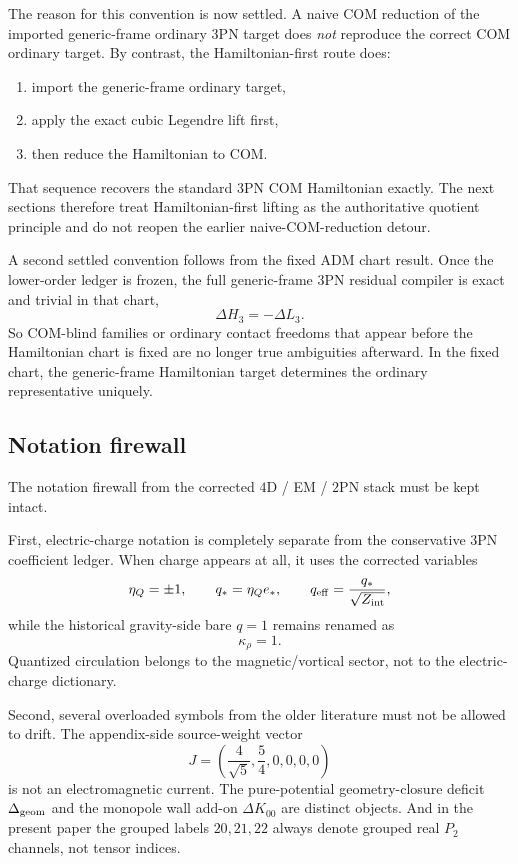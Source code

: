 \documentclass[11pt]{article}
\begin{document}
The reason for this convention is now settled.  A naive COM reduction of the
imported generic-frame ordinary $3$PN target does \emph{not} reproduce the
correct COM ordinary target.  By contrast, the Hamiltonian-first route does:
\begin{enumerate}
  \item import the generic-frame ordinary target,
  \item apply the exact cubic Legendre lift first,
  \item then reduce the Hamiltonian to COM.
\end{enumerate}
That sequence recovers the standard $3$PN COM Hamiltonian exactly.  The next
sections therefore treat Hamiltonian-first lifting as the authoritative quotient
principle and do not reopen the earlier naive-COM-reduction detour.

A second settled convention follows from the fixed ADM chart result.  Once the
lower-order ledger is frozen, the full generic-frame $3$PN residual compiler is
exact and trivial in that chart,
\[
\Delta H_3=-\Delta L_3.
\]
So COM-blind families or ordinary contact freedoms that appear before the
Hamiltonian chart is fixed are no longer true ambiguities afterward.  In the
fixed chart, the generic-frame Hamiltonian target determines the ordinary
representative uniquely.

\subsection{Notation firewall}
\label{sec:dict-firewall}

The notation firewall from the corrected $4$D / EM / $2$PN stack must be kept
intact.

First, electric-charge notation is completely separate from the conservative
$3$PN coefficient ledger.  When charge appears at all, it uses the corrected
variables
\[
\eta_Q=\pm1,
\qquad
q_* = \eta_Q e_*,
\qquad
q_{\rm eff}=\frac{q_*}{\sqrt{Z_{\rm int}}},
\]
while the historical gravity-side bare $q=1$ remains renamed as
\[
\kappa_\rho=1.
\]
Quantized circulation belongs to the magnetic/vortical sector, not to the
electric-charge dictionary.

Second, several overloaded symbols from the older literature must not be allowed
to drift.  The appendix-side source-weight vector
\[
J=\left(\frac{4}{\sqrt5},\frac54,0,0,0,0\right)
\]
is not an electromagnetic current.  The pure-potential geometry-closure deficit
$\Delta_{\rm geom}$ and the monopole wall add-on $\Delta K_{00}$ are distinct
objects.  And in the present paper the grouped labels $20,21,22$ always denote
grouped real $P_2$ channels, not tensor indices.
\end{document}
